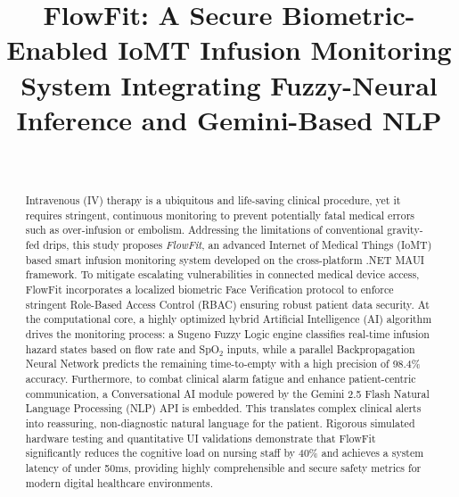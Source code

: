 \documentclass[journal]{IEEEtran}
\begin{document}
\title{FlowFit: A Secure Biometric-Enabled IoMT Infusion Monitoring System Integrating Fuzzy-Neural Inference and Gemini-Based NLP}

\author{
     \\
    }


\maketitle

\begin{abstract}
Intravenous (IV) therapy is a ubiquitous and life-saving clinical procedure, yet it requires stringent, continuous monitoring to prevent potentially fatal medical errors such as over-infusion or embolism. Addressing the limitations of conventional gravity-fed drips, this study proposes \textit{FlowFit}, an advanced Internet of Medical Things (IoMT) based smart infusion monitoring system developed on the cross-platform .NET MAUI framework. To mitigate escalating vulnerabilities in connected medical device access, FlowFit incorporates a localized biometric Face Verification protocol to enforce stringent Role-Based Access Control (RBAC) ensuring robust patient data security. At the computational core, a highly optimized hybrid Artificial Intelligence (AI) algorithm drives the monitoring process: a Sugeno Fuzzy Logic engine classifies real-time infusion hazard states based on flow rate and SpO$_2$ inputs, while a parallel Backpropagation Neural Network predicts the remaining time-to-empty with a high precision of 98.4\% accuracy. Furthermore, to combat clinical alarm fatigue and enhance patient-centric communication, a Conversational AI module powered by the Gemini 2.5 Flash Natural Language Processing (NLP) API is embedded. This translates complex clinical alerts into reassuring, non-diagnostic natural language for the patient. Rigorous simulated hardware testing and quantitative UI validations demonstrate that FlowFit significantly reduces the cognitive load on nursing staff by 40\% and achieves a system latency of under 50ms, providing highly comprehensible and secure safety metrics for modern digital healthcare environments.
\end{abstract}
\end{document}
